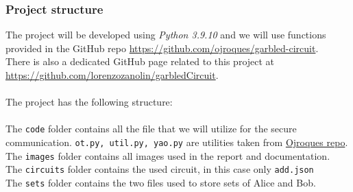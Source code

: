 \documentclass[12pt]{article}
\newcommand{\inlinecode}{\texttt}
\begin{document}
\subsubsection{Project structure}
The project will be developed using \textit{Python 3.9.10} and we will use functions provided in the GitHub repo \url{https://github.com/ojroques/garbled-circuit}\label{ref:git}.\\
There is also a dedicated GitHub page related to this project at \url{https://github.com/lorenzozanolin/garbledCircuit}\label{zanoGit}.\\ \\ The project has the following structure:\\ \\
The \inlinecode{code} folder contains all the file that we will utilize for the secure communication. \inlinecode{ot.py, util.py, yao.py} are utilities taken from \hyperref[ref:git]{Ojroques repo}.\\
The \inlinecode{images} folder contains all images used in the report and documentation.\\
The \inlinecode{circuits} folder contains the used circuit, in this case only \inlinecode{add.json}\\
The \inlinecode{sets} folder contains the two files used to store sets of Alice and Bob.\\ \\
\\ \\
\end{document}
